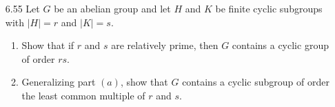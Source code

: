 \documentclass[12pt]{article}
\begin{document}
\begin{enumerate}
\begin{enumerate}
	\end{enumerate}
	
	\item[6.55] Let $G$ be an abelian group and let $H$ and $K$ be finite cyclic subgroups with $|H| = r$ and $|K| = s$.
	\begin{enumerate}
		\item Show that if $r$ and $s$ are relatively prime, then $G$ contains a cyclic group of order $rs$.
		\item Generalizing part $(a)$, show that $G$ contains a cyclic subgroup of order the least common multiple of $r$ and $s$.
	\end{enumerate}
\end{enumerate}
\end{document}

